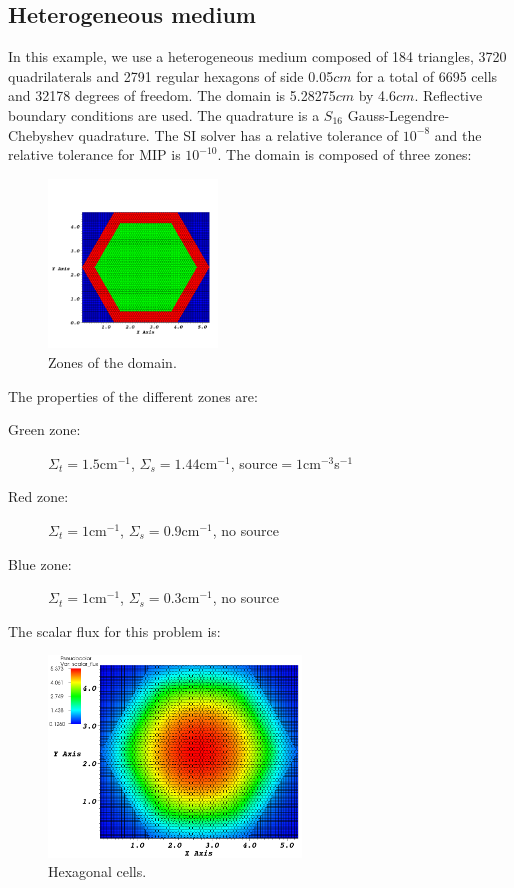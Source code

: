 \subsection{Heterogeneous medium}
In this example, we use a heterogeneous medium composed of 184 triangles, 3720
quadrilaterals and 2791 regular hexagons of side 0.05$cm$ for a total of 6695 
cells and 32178 degrees of freedom. The domain is 5.28275$cm$ by 4.6$cm$. 
Reflective boundary conditions are used. The quadrature is a $S_{16}$ 
Gauss-Legendre-Chebyshev quadrature. The SI solver has a relative tolerance of 
$10^{-8}$ and the relative tolerance for MIP is $10^{-10}$. The domain is 
composed of three zones:
\begin{figure}[H]
\centering
\includegraphics[width=0.4\textwidth]{source_crop}
\caption{Zones of the domain.}
\end{figure}
The properties of the different zones are:
\begin{description}
\item[Green zone:] $\Sigma_t =1.5$cm$^{-1}$, $\Sigma_s = 1.44$cm$^{-1}$, source$ =
1$cm$^{-3}$s$^{-1}$
\item[Red zone:] $\Sigma_t = 1$cm$^{-1}$, $\Sigma_s = 0.9$cm$^{-1}$, no source
\item[Blue zone:] $\Sigma_t = 1$cm$^{-1}$, $\Sigma_s = 0.3$cm$^{-1}$, no source
\end{description}
The scalar flux for this problem is:
\begin{figure}[H]
\centering
\includegraphics[width=0.6\textwidth]{heterog_hex_crop}
\caption{Hexagonal cells.}
\end{figure}
